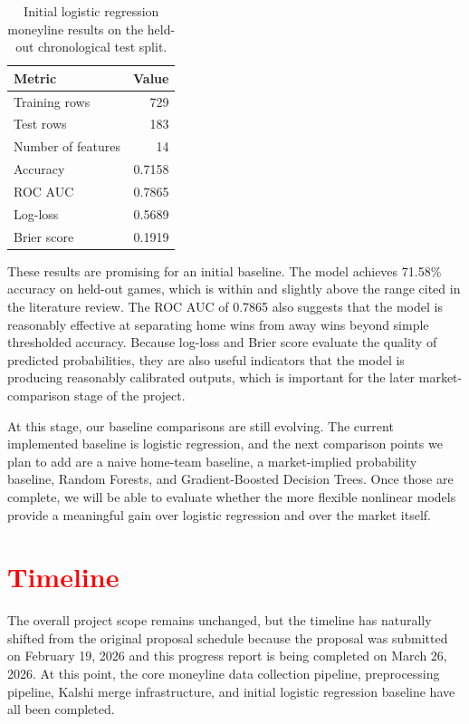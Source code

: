 \documentclass[sigconf]{acmart}
\begin{document}
\begin{table}[t]
\caption{Initial logistic regression moneyline results on the held-out chronological test split.}
\label{tab:logistic-results}
\begin{tabular}{lr}
\toprule
Metric & Value \\
\midrule
Training rows & 729 \\
Test rows & 183 \\
Number of features & 14 \\
Accuracy & 0.7158 \\
ROC AUC & 0.7865 \\
Log-loss & 0.5689 \\
Brier score & 0.1919 \\
\bottomrule
\end{tabular}
\end{table}

These results are promising for an initial baseline. The model achieves 71.58\% accuracy on held-out games, which is within and slightly above the range cited in the literature review. The ROC AUC of 0.7865 also suggests that the model is reasonably effective at separating home wins from away wins beyond simple thresholded accuracy. Because log-loss and Brier score evaluate the quality of predicted probabilities, they are also useful indicators that the model is producing reasonably calibrated outputs, which is important for the later market-comparison stage of the project.

At this stage, our baseline comparisons are still evolving. The current implemented baseline is logistic regression, and the next comparison points we plan to add are a naive home-team baseline, a market-implied probability baseline, Random Forests, and Gradient-Boosted Decision Trees. Once those are complete, we will be able to evaluate whether the more flexible nonlinear models provide a meaningful gain over logistic regression and over the market itself.

\section{\textcolor{red}{Timeline}}
The overall project scope remains unchanged, but the timeline has naturally shifted from the original proposal schedule because the proposal was submitted on February 19, 2026 and this progress report is being completed on March 26, 2026. At this point, the core moneyline data collection pipeline, preprocessing pipeline, Kalshi merge infrastructure, and initial logistic regression baseline have all been completed.
\end{document}
